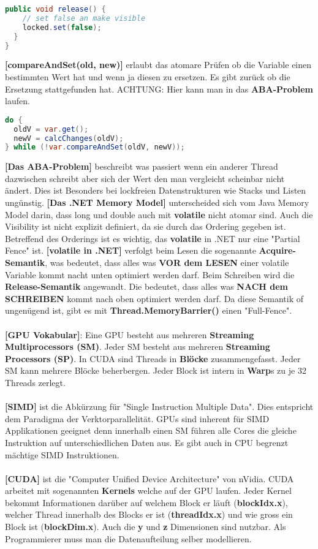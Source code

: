 \documentclass[8pt]{extarticle}
\let\oldtextbf\textbf
\renewcommand{\textbf}{\tiny\oldtextbf}
\begin{document}
\begin{multicols*}{5}
\begin{lstlisting}[language=java]
  public void release() {
    // set false an make visible
    locked.set(false);
  }
}
\end{lstlisting}
\textbf{[compareAndSet(old, new)]} erlaubt das atomare Prüfen ob die Variable einen bestimmten Wert hat und wenn ja diesen zu ersetzen. Es gibt zurück ob die Ersetzung stattgefunden hat. ACHTUNG: Hier kann man in das \textbf{ABA-Problem} laufen.
\begin{lstlisting}[language=java]
do {
  oldV = var.get();
  newV = calcChanges(oldV);
} while (!var.compareAndSet(oldV, newV));
\end{lstlisting}
\textbf{[Das ABA-Problem]} beschreibt was passiert wenn ein anderer Thread dazwischen schreibt aber sich der Wert den man vergleicht scheinbar nicht ändert. Dies ist Besonders bei lockfreien Datenstrukturen wie Stacks und Listen ungünstig.
\textbf{[Das .NET Memory Model]} unterscheided sich vom Java Memory Model darin, dass long und double auch mit \textbf{volatile} nicht atomar sind. Auch die Visibility ist nicht explizit definiert, da sie durch das Ordering gegeben ist. Betreffend des Orderings ist es wichtig, das \textbf{volatile} in .NET nur eine "Partial Fence" ist.
\textbf{[volatile in .NET]} verfolgt beim Lesen die sogenannte \textbf{Acquire-Semantik}, was bedeutet, dass alles was \textbf{VOR dem LESEN} einer volatile Variable kommt nacht unten optimiert werden darf. Beim Schreiben wird die \textbf{Release-Semantik} angewandt. Die bedeutet, dass alles was \textbf{NACH dem SCHREIBEN} kommt nach oben optimiert werden darf. Da diese Semantik of ungenügend ist, gibt es mit \textbf{Thread.MemoryBarrier()} einen "Full-Fence".\\\\
\textbf{[GPU Vokabular]}: Eine GPU besteht aus mehreren \textbf{Streaming Multiprocessors (SM)}. Jeder SM besteht aus mehreren \textbf{Streaming Processors (SP)}. In CUDA sind Threads in \textbf{Blöcke} zusammengefasst. Jeder SM kann mehrere Blöcke beherbergen. Jeder Block ist intern in \textbf{Warp}s zu je 32 Threads zerlegt.\\\\
\textbf{[SIMD]} ist die Abkürzung für "Single Instruction Multiple Data". Dies entspricht dem Paradigma der Verktorparallelität. GPUs sind inherent für SIMD Applikationen geeignet denn innerhalb einen SM führen alle Cores die gleiche Instruktion auf unterschiedlichen Daten aus. Es gibt auch in CPU begrenzt mächtige SIMD Instruktionen.\\\\
\textbf{[CUDA]} ist die "Computer Unified Device Architecture" von nVidia. CUDA arbeitet mit sogenannten \textbf{Kernels} welche auf der GPU laufen. Jeder Kernel bekommt Informationen darüber auf welchem Block er läuft (\textbf{blockIdx.x}), welcher Thread innerhalb des Blocks er ist (\textbf{threadIdx.x}) und wie gross ein Block ist (\textbf{blockDim.x}). Auch die \textbf{y} und \textbf{z} Dimensionen sind nutzbar. Als Programmierer muss man die Datenaufteilung selber modellieren.

\end{multicols*}
\end{document}

